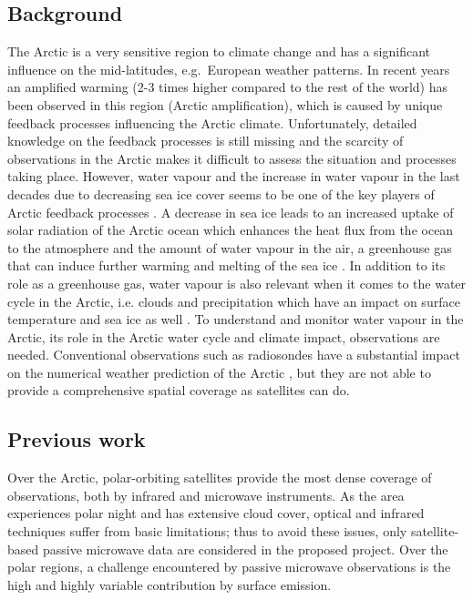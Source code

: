 \documentclass[12pt,oneside,a4paper]{article}
\begin{document}
\subsection{Background}
%
\label{sec:background}
The Arctic is a very sensitive region to climate change and has a significant
influence on the mid-latitudes, e.g.\ European weather patterns. In recent
years an amplified warming (2-3 times higher compared to the rest of the world)
has been observed in this region (Arctic amplification), which is caused by
unique feedback processes influencing the Arctic climate. Unfortunately,
detailed knowledge on the feedback processes is still missing and the scarcity
of observations in the Arctic makes it difficult to assess the situation and
processes taking place. However, water vapour and the increase in water vapour
in the last decades due to decreasing sea ice cover seems to be one of the key
players of Arctic feedback processes \citep[e.g.][]{ vihma:2016:theat}. A decrease in sea ice leads to an increased uptake of solar
radiation of the Arctic ocean which enhances the heat flux from the ocean to
the atmosphere and the amount of water vapour in the air, a greenhouse gas that
can induce further warming and melting of the sea ice \citep{screen:2010:thece}. In
addition to its role as a greenhouse gas, water vapour is also relevant when it
comes to the water cycle in the Arctic, i.e. clouds and precipitation which
have an impact on surface temperature and sea ice as well
\citep{blanchet:water:1995}. To understand and monitor water vapour in the
Arctic, its role in the Arctic water cycle and climate impact,  observations
are needed. Conventional observations such as radiosondes have a substantial
impact on the numerical weather prediction of the Arctic
\citep{lawrence:2019:usean}, but they are not able to provide a comprehensive
spatial coverage as satellites can do.

\subsection{Previous work}
%
\label{sec:previousworks}
%
Over the Arctic, polar-orbiting satellites provide the most dense coverage
of observations, both by infrared and microwave instruments. As the area
experiences polar night and has extensive cloud cover, optical and infrared
techniques suffer from basic limitations; thus to avoid these issues, only
satellite-based passive microwave data are considered in the proposed project. Over the polar regions, a challenge encountered by passive microwave observations is the high and highly variable contribution by surface emission.
\end{document}
